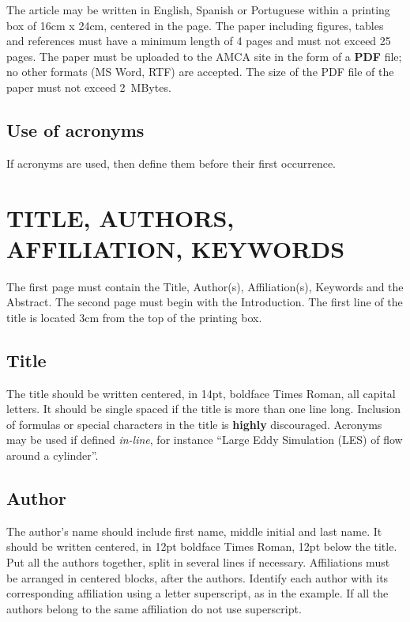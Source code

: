 \documentclass[oneside,a4paper,english,links]{amca}
\begin{document}
The article may be written in English, Spanish or Portuguese within a
printing box of 16cm x 24cm, centered in the page. The paper including
figures, tables and references must have a minimum length of 4 pages
and must not exceed 25 pages. The paper must be uploaded to the AMCA
site in the form of a \textbf{PDF} file; no other formats (MS Word,
RTF) are accepted. The size of the PDF file of the paper must not
exceed 2~MBytes.

\subsection{Use of acronyms}

If acronyms are used, then define them before their first
occurrence. 

\section{TITLE, AUTHORS, AFFILIATION, KEYWORDS}

The first page must contain the Title, Author(s), Affiliation(s),
Keywords and the Abstract. The second page must begin with the
Introduction. The first line of the title is located 3cm from the top
of the printing box. 

\subsection{Title}

The title should be written centered, in 14pt, boldface Times Roman,
all capital letters. It should be single spaced if the title is more
than one line long. Inclusion of formulas or special characters in the
title is \textbf{highly} discouraged. Acronyms may be used if defined
\emph{in-line}, for instance ``Large Eddy Simulation (LES) of
flow around a cylinder''.

\subsection{Author}

The author's name should include first name, middle initial and last
name. It should be written centered, in 12pt boldface Times Roman,
12pt below the title. Put all the authors together, split in several
lines if necessary. Affiliations must be arranged in centered blocks,
after the authors. Identify each author with its corresponding
affiliation using a letter superscript, as in the example. If all the
authors belong to the same affiliation do not use superscript. 
\end{document}
